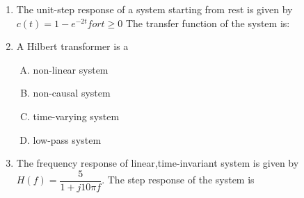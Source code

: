 \documentclass[journal,12pt,twocolumn]{IEEEtran}
\begin{document}
\begin{enumerate}[1.]
\begin{enumerate}[(A)]
\end{enumerate}


\item The unit-step response of a system starting from rest is given by \newline $c(t)=1-e^{-2t} for t \geq 0$
\newline The transfer function of the system is:


\begin{enumerate}[(A)]
\end{enumerate}


\item A Hilbert transformer is a\\

\begin{enumerate}[(A)]
\setlength\itemsep{1em}

\item non-linear system
\item non-causal system
\item time-varying system
\item low-pass system

\end{enumerate}

\item The frequency response of linear,time-invariant system is given by $H(f)=\dfrac{5}{1+j10\pi f}$. The step response of the system is\\
\begin{enumerate}[(A)]


\end{enumerate}
\end{enumerate}
\end{document}
